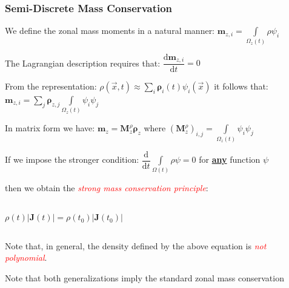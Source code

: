 \documentclass[8pt,xcolor=svgnames]{beamer}
\begin{document}
\begin{frame}
 \frametitle{Semi-Discrete Mass Conservation}
We define the zonal mass moments in a natural manner: \quad $\displaystyle{\mathbf{m}_{z,i}=\int\limits_{\Omega_z(t)} \rho \psi_i}$

The Lagrangian description requires that: \quad $\dfrac{\mathrm{d}\mathbf{m}_{z,i}}{\mathrm{d}t}=0$

From the representation: \quad $\rho(\vec{x},t)\approx \displaystyle{\sum_i} \mathbf{\rho}_i(t) \psi_i(\vec{x})$ \quad it follows that: \quad
$\displaystyle{\mathbf{m}_{z,i}=\sum_j\mathbf{\rho}_{z,j}\int\limits_{\Omega_z(t)} \psi_i\psi_j}$

In matrix form we have: \quad \colorbox{cyan!30}{$\displaystyle
     \mathbf{m}_z=\mathbf{M}_z^\rho \mathbf{\rho}_z$} \quad where \quad $\displaystyle
     (\mathbf{M}_z^\rho)_{i,j}=\int\limits_{\Omega_z(t)} \psi_i \psi_j$

If we impose the stronger condition: \quad $\dfrac{\mathrm{d}}{\mathrm{d}t}\int\limits_{\Omega(t)}\rho\psi=0$ \quad for \underline{\textbf{any}} function $\psi$

then we obtain the \textcolor{red}{\emph{strong mass conservation principle}}:
\begin{columns}[T]
\begin{column}{0.4\textwidth}
\colorbox{cyan!30}{$
 \rho(t)|\mathbf{J}(t)|=\rho(t_0)|\mathbf{J}(t_0)|$}
\end{column}
\end{columns}

Note that, in general, the density defined by the above equation is \textcolor{red}{\emph{not polynomial}}.

\begin{block}{}\centering
 Note that both generalizations imply the standard zonal mass conservation
\end{block}
\end{frame}
\end{document}
